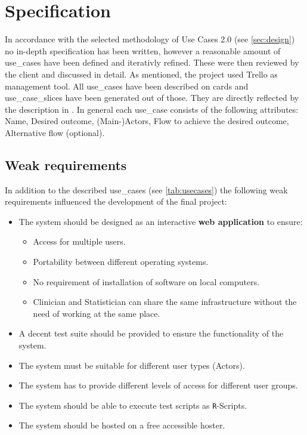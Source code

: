 \section{Specification}
\label{sec:specification}

In accordance with the selected methodology of Use Cases 2.0 (see \autoref{sec:design}) no in-depth specification has been written, however a reasonable amount of \glspl{use_case} have been defined and iterativly refined. These were then reviewed by the client and discussed in detail. As mentioned, the project used Trello as management tool. All \glspl{use_case} have been described on cards and \glspl{use_case_slice} have been generated out of those. They are directly reflected by the description in \cite{sassoon2014,sassoon2016, sassoon2016CD}. In general each \gls{use_case} consists of the following attributes: Name, Desired outcome, (Main-)\glspl{Actor}, Flow to achieve the desired outcome, Alternative flow (optional).


\subsection{Weak requirements}
In addition to the described \glspl{use_case} (see \autoref{tab:usecases}) the following weak requirements influenced the development of the final project:

\begin{itemize}
	\item The system should be designed as an interactive \textbf{web application} to ensure:
	\begin{itemize}
		\item Access for multiple users.
		\item Portability between different operating systems.
		\item No requirement of installation of software on local computers.
		\item Clinician and Statistician can share the same infrastructure without the need of working at the same place.
	\end{itemize}
	\item A decent test suite should be provided to ensure the functionality of the system.
	\item The system must be suitable for different user types (\glspl{Actor}).
	\item The system has to provide different levels of access for different user groups.
	\item The system should be able to execute test scripts as \texttt{R}-Scripts.
	\item The system should be hosted on a free accessible hoster.
\end{itemize}

